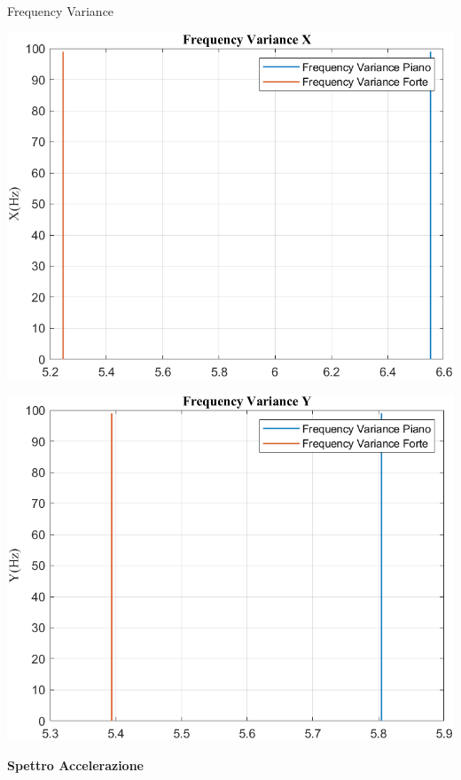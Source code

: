 \documentclass[beamer]{standalone}
\begin{document}
	\begin{frame}{{Frequency Variance}}
		\begin{minipage}{.45\textwidth}
			\centering\includegraphics[width=.9\textwidth]{figure/Acc/Trasformata/Frequency VarianceX}
		\end{minipage}
		\hspace{.05\textwidth}
		\begin{minipage}{.45\textwidth}
			\centering\includegraphics[width=.9\textwidth]{figure/Acc/Trasformata/Frequency VarianceY}
		\end{minipage}
	\end{frame}
	
	\begin{frame}
		\color{blue}\centering\huge{\textbf{Spettro Accelerazione}}
	\end{frame}
	
\end{document}
